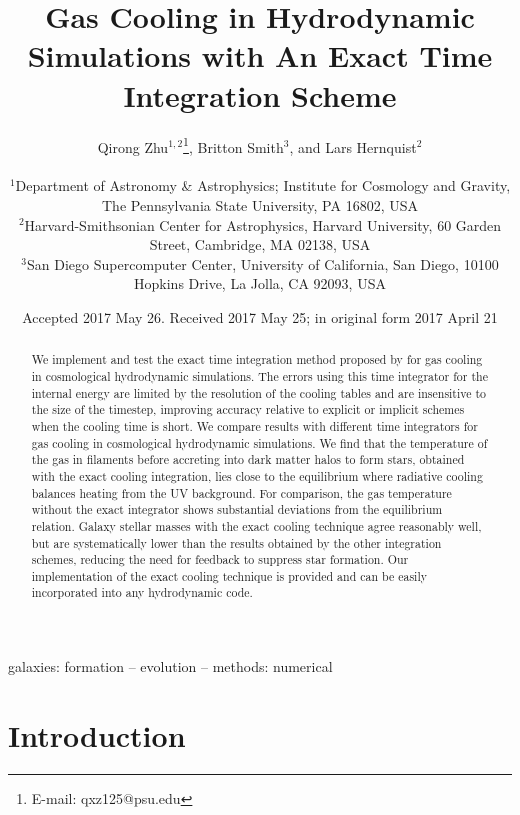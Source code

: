 \documentclass[a4paper,fleqn,usenatbib,useAMS, twocolumn]{mnras}
\title[Gas Cooling With An Exact Time Integration Scheme]{Gas Cooling in Hydrodynamic Simulations with An Exact Time Integration Scheme}
\author[ Q. Zhu et al.]
{Qirong Zhu$^{1,2}$\thanks{E-mail: qxz125@psu.edu}, 
Britton Smith$^{3}$, and
Lars Hernquist$^{2}$ 
\vspace{0.5cm}\\
\parbox{\textwidth}
{\small $^{1}$Department of Astronomy \& Astrophysics; Institute for Cosmology and Gravity, The Pennsylvania State University, PA 16802, USA\\
$^{2}$Harvard-Smithsonian Center for Astrophysics, Harvard University, 60 Garden Street, Cambridge, MA 02138, USA\\
$^{3}$San Diego Supercomputer Center, University of California, San Diego, 10100 Hopkins Drive, La Jolla, CA 92093, USA\\
}}
\begin{document}
\date{Accepted 2017 May 26. Received 2017 May 25; in original form 2017 April 21}

\pagerange{\pageref{firstpage}--\pageref{lastpage}} 

\maketitle

\label{firstpage}

\begin{abstract}
We implement and test the exact time integration method proposed by
\cite{Townsend2009} for gas cooling in cosmological hydrodynamic
simulations. The errors using this time integrator for the internal energy 
are limited by the resolution
of the cooling tables and are insensitive to the size of the
timestep, improving accuracy relative to explicit or
implicit schemes when the cooling time is short. We compare
results with different time integrators for gas
cooling in cosmological hydrodynamic simulations. We find that the
temperature of the gas in filaments before accreting into dark matter
halos to form stars, obtained with the exact cooling integration, lies
close to the equilibrium where radiative cooling
balances heating from the UV background.  For comparison, the gas
temperature without the exact integrator shows
substantial deviations from the equilibrium relation.  Galaxy stellar
masses with the exact cooling technique agree reasonably
well, but are systematically lower than the results
obtained by the other integration schemes, reducing the
need for feedback to suppress star formation.
Our implementation of the exact cooling technique is provided
and can be easily incorporated into any hydrodynamic code.
\end{abstract}

\begin{keywords}
galaxies: formation -- evolution -- methods: numerical
\end{keywords}

\section{Introduction}
\end{document}
